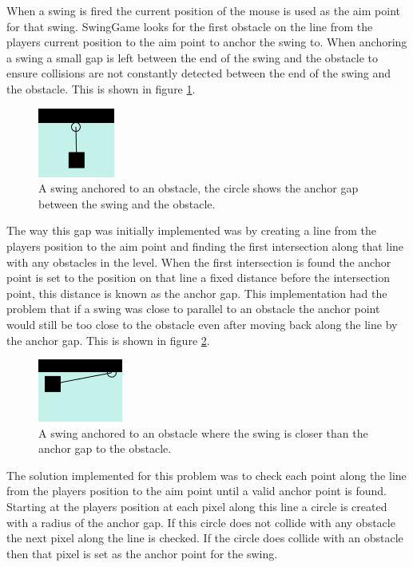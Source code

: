 \documentclass[]{report}
\begin{document}
			When a swing is fired the current position of the mouse is used as the aim point for that swing. SwingGame looks for the first obstacle on the line from the players current position to the aim point to anchor the swing to. When anchoring a swing a small gap is left between the end of the swing and the obstacle to ensure collisions are not constantly detected between the end of the swing and the obstacle. This is shown in figure \ref{anchorGap}.
			
			\begin{figure}[H]
				\centering
				\includegraphics{anchorGap}
				\caption{A swing anchored to an obstacle, the circle shows the anchor gap between the swing and the obstacle.}
				\label{anchorGap}
			\end{figure}
			
			The way this gap was initially implemented was by creating a line from the players position to the aim point and finding the first intersection along that line with any obstacles in the level. When the first intersection is found the anchor point is set to the position on that line a fixed distance before the intersection point, this distance is known as the anchor gap. This implementation had the problem that if a swing was close to parallel to an obstacle the anchor point would still be too close to the obstacle even after moving back along the line by the anchor gap. This is shown in figure \ref{anchorProblem}.
			
			\begin{figure}[H]
				\centering
				\includegraphics{anchorProblem}
				\caption{A swing anchored to an obstacle where the swing is closer than the anchor gap to the obstacle.}
				\label{anchorProblem}
			\end{figure}
			
			The solution implemented for this problem was to check each point along the line from the players position to the aim point until a valid anchor point is found. Starting at the players position at each pixel along this line a circle is created with a radius of the anchor gap. If this circle does not collide with any obstacle the next pixel along the line is checked. If the circle does collide with an obstacle then that pixel is set as the anchor point for the swing.
			
\end{document}
